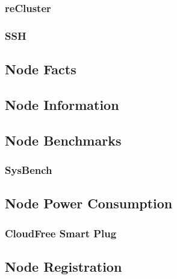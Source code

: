 \subsubsection{reCluster}
\label{subsubsec:implementation_installer_configuration_files_recluster}

\subsubsection{SSH}
\label{subsubsec:implementation_installer_configuration_files_ssh}

\subsection{Node Facts}
\label{subsec:implementation_installer_node_facts}

\subsection{Node Information}
\label{subsec:implementation_installer_node_information}

\subsection{Node Benchmarks}
\label{subsec:implementation_installer_node_benchmarks}

\subsubsection{SysBench}
\label{subsubsec:implementation_installer_node_benchmarks_sysbench}

\subsection{Node Power Consumption}
\label{subsec:implementation_installer_node_power_consumption}

\subsubsection{CloudFree Smart Plug}
\label{subsubsec:implementation_installer_node_power_consumption_cloudfree_smart_plug}

\subsection{Node Registration}
\label{subsec:implementation_installer_node_registration}

